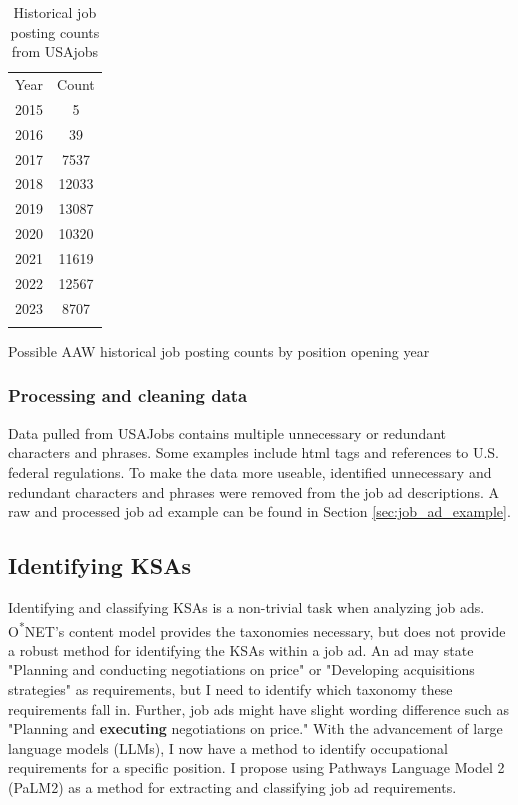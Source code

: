 \documentclass[12pt]{article}
\begin{document}
\begin{table}[ht!]
\begin{subtable}[b]{0.4\linewidth}
\begin{tabular}{cc}
            \Xhline{3\arrayrulewidth}
                Year &  Count\\\Xhline{3\arrayrulewidth}
                2015 &      5\\
                2016 &     39\\
                2017 &   7537\\
                2018 &  12033\\
                2019 &  13087\\
                2020 &  10320\\
                2021 &  11619\\
                2022 &  12567\\
                2023 &   8707\\
            \Xhline{3\arrayrulewidth}
        \end{tabular}
        \caption{Possible AAW historical job posting counts by position opening year}\label{tab:aaw_job_opening_count}
    \end{subtable}
    \caption{Historical job posting counts from USAjobs}\label{tab:usa_jobs}
\end{table}

\subsubsection{Processing and cleaning data}

Data pulled from USAJobs contains multiple unnecessary or redundant characters and phrases. Some examples include html tags and references to U.S. federal regulations. To make the data more useable, identified unnecessary and redundant characters and phrases were removed from the job ad descriptions. A raw and processed job ad example can be found in Section \ref{sec:job_ad_example}.

\subsection{Identifying KSAs}

Identifying and classifying KSAs is a non-trivial task when analyzing job ads. O\textsuperscript{*}NET's content model provides the taxonomies necessary, but does not provide a robust method for identifying the KSAs within a job ad. An ad may state "Planning and conducting negotiations on price" or "Developing acquisitions strategies" as requirements, but I need to identify which taxonomy these requirements fall in. Further, job ads might have slight wording difference such as "Planning and \textbf{executing} negotiations on price." With the advancement of large language models (LLMs), I now have a method to identify occupational requirements for a specific position. I propose using Pathways Language Model 2 (PaLM2) as a method for extracting and classifying job ad requirements.
\end{document}
